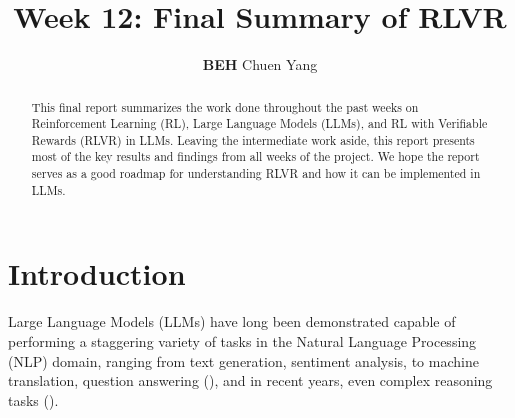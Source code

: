 \documentclass{article} %
\title{Week 12: Final Summary of RLVR}
\author{\textbf{BEH} Chuen Yang}
\theoremstyle{definition}
\begin{document}
\ifcolmsubmission
\linenumbers
\fi

\maketitle


\begin{abstract}
    This final report summarizes the work done throughout the past weeks on Reinforcement Learning (RL), Large Language Models (LLMs),
    and RL with Verifiable Rewards (RLVR) in LLMs.
    Leaving the intermediate work aside, this report presents most of the key results and findings from all weeks of the project.
    We hope the report serves as a good roadmap for understanding RLVR and how it can be implemented in LLMs.
\end{abstract}

\section{Introduction}
Large Language Models (LLMs) have long been demonstrated capable of performing a staggering variety of tasks
in the Natural Language Processing (NLP) domain, ranging from text generation, 
sentiment analysis, to machine translation, question answering (\cite{Brown-et-al-2020}),
and in recent years, even complex reasoning tasks (\cite{tulu3, grpo, r1}).
\end{document}
